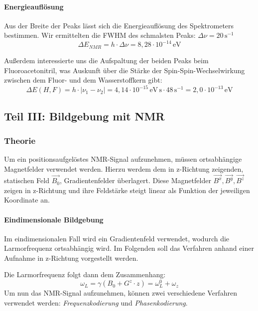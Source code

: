 \documentclass[a4paper]{scrartcl} %
\begin{document}
\paragraph{Energieauflösung}

Aus der Breite der Peaks lässt sich die Energieauflösung des Spektrometers bestimmen. Wir ermittelten die FWHM des schmalsten Peaks: $\Delta \nu = 20\, \mathrm{s^{-1}}$
\begin{equation}
	\Delta E_{NMR} = h \cdot \Delta \nu = 8,28 \cdot 10^{-14} \, \mathrm{eV}
\end{equation}

Außerdem interessierte uns die Aufspaltung der beiden Peaks beim Fluoroacetonitril, was Auskunft über die Stärke der Spin-Spin-Wechselwirkung zwischen dem Fluor- und dem Wasserstoffkern gibt:
\begin{equation}
	\Delta E(H, F) = h \cdot | \nu_1 - \nu_2 | = 4,14 \cdot 10^{-15} \, \mathrm{eV\,s} \cdot 48 \, \mathrm{s^{-1}} = 2,0 \cdot 10^{-13} \, \mathrm{eV}
\end{equation}

\newpage

\subsection{Teil III: Bildgebung mit NMR}

\subsubsection{Theorie}

Um ein positionsaufgelöstes NMR-Signal aufzunehmen, müssen ortsabhängige Magnetfelder verwendet werden. Hierzu werdem dem in z-Richtung zeigenden, statischen Feld $\vec{B_0}$, Gradientenfelder überlagert. Diese Magnetfelder $\vec{B^x}, \vec{B^y}, \vec{B^z}$ zeigen in z-Richtung und ihre Feldstärke steigt linear als Funktion der jeweiligen Koordinate an.

\paragraph{Eindimensionale Bildgebung}

Im eindimensionalen Fall wird ein Gradientenfeld verwendet, wodurch die Larmorfrequenz ortsabhängig wird. Im Folgenden soll das Verfahren anhand einer Aufnahme in z-Richtung vorgestellt werden.

Die Larmorfrequenz folgt dann dem Zusammenhang:
\begin{equation}
	\omega_L = \gamma (B_0 + G^z \cdot z) = \omega_L^0 + \omega_z
	\label{eq:larmor_mod}
\end{equation}
Um nun das NMR-Signal aufzunehmen, können zwei verschiedene Verfahren verwendet werden: \emph{Frequenzkodierung} und \emph{Phasenkodierung}.
\end{document}
